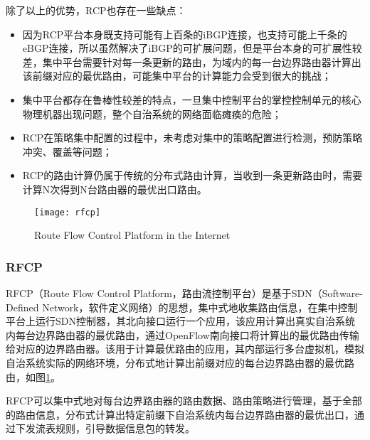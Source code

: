 除了以上的优势，RCP也存在一些缺点\cite{Feamster2004The}：
\begin{itemize}
    \item 因为RCP平台本身既支持可能有上百条的iBGP连接，也支持可能上千条的eBGP连接，所以虽然解决了iBGP的可扩展问题，但是平台本身的可扩展性较差，集中平台需要针对每一条更新的路由，为域内的每一台边界路由器计算出该前缀对应的最优路由，可能集中平台的计算能力会受到很大的挑战；
    \item 集中平台都存在鲁棒性较差的特点，一旦集中控制平台的掌控控制单元的核心物理机器出现问题，整个自治系统的网络面临瘫痪的危险；
    \item RCP在策略集中配置的过程中，未考虑对集中的策略配置进行检测，预防策略冲突、覆盖等问题；
    \item RCP的路由计算仍属于传统的分布式路由计算，当收到一条更新路由时，需要计算N次得到N台路由器的最优出口路由。
\end{itemize}

\begin{figure}
  \centering
  \texttt{[image: rfcp]}
  \caption{Route Flow Control Platform in the Internet\cite{RothenbergHotSDN}}
  \label{fig:rfcp}
\end{figure}

\subsubsection{RFCP\cite{RothenbergHotSDN}}
RFCP（Route Flow Control Platform，路由流控制平台）是基于SDN\cite{sdnsurvey2014ieee}（Software-Defined Network，软件定义网络）的思想，集中式地收集路由信息，在集中控制平台上运行SDN控制器，其北向接口运行一个应用，该应用计算出真实自治系统内每台边界路由器的最优路由，通过OpenFlow\cite{openflow}南向接口将计算出的最优路由传输给对应的边界路由器。该用于计算最优路由的应用，其内部运行多台虚拟机，模拟自治系统实际的网络环境，分布式地计算出前缀对应的每台边界路由器的最优路由，如图\ref{fig:rfcp}。

RFCP可以集中式地对每台边界路由器的路由数据、路由策略进行管理，基于全部的路由信息，分布式计算出特定前缀下自治系统内每台边界路由器的最优出口，通过下发流表规则，引导数据信息包的转发。

